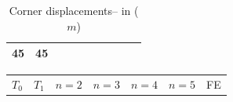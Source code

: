 \documentclass[journal]{new-aiaa}
\begin{document}
\begin{table}[!h]
\begin{tabular}{@{}llllllllll@{}}
		45         & 45        &                                                  &                                                  &                                                  &                                                  &                                                  &                                                  &                                                  &                                                  \\ \hline
	\end{tabular}
\label{disp}
\caption{Corner displacements-- in ($m$)}
\end{table}

\begin{table}[!h]
	\begin{tabular}{@{}lllllllllll@{}}
		\hline
		\multirow{ 2}{*}{$T_0$}
		&
		\multirow{ 2}{*}{$T_1$}
		& \multicolumn{2}{l}{$n=2$}                                        & \multicolumn{2}{l}{$n=3$}                                                                            & \multicolumn{2}{l}{$n=4$}                                                                            & 
		\multicolumn{2}{l}{$n=5$}    
	     & 
	    \multirow{ 2}{*}{FE}         \\ \cline{3-10}     
		

\end{tabular}
\end{table}
\end{document}

